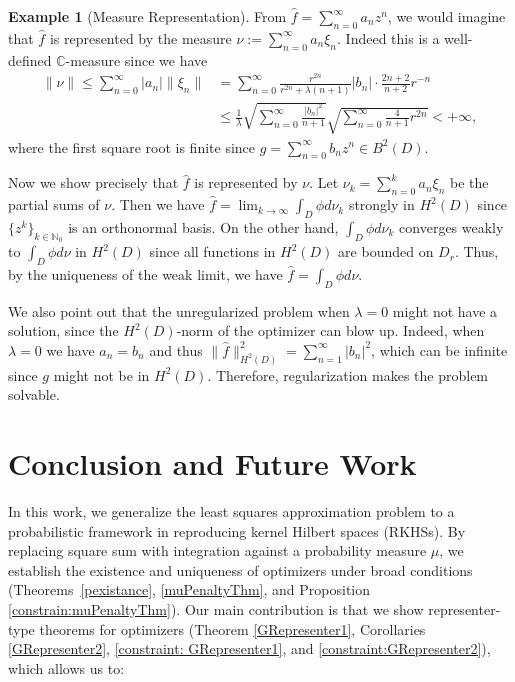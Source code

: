 \documentclass{amsart}
\numberwithin{equation}{section}
\newcommand\N{{\mathbb N}}
\theoremstyle{plain}
\theoremstyle{remark}
\theoremstyle{definition}
\newtheorem{example}[subsection]{Example}
\begin{document}
\begin{example}[Measure Representation]
From $\hat{f}=\sum_{n=0}^\infty a_nz^n$, we would imagine that $\hat{f}$ is represented by the measure $\nu:=\sum_{n=0}^\infty a_n \xi_n$.
Indeed this is a well-defined $\mathbb{C}$-measure since we have
\begin{align*}
        \|\nu\|\leq \sum_{n=0}^\infty |a_n|  \|\xi_n\|
    &= \sum_{n=0}^\infty \frac{r^{2n}}{r^{2n}+\lambda(n+1)}|b_n| \cdot \frac{2n+2}{n+2}r^{-n} \\
    &\leq \frac{1}{\lambda}\sqrt{\sum_{n=0}^\infty \frac{|b_n|^2}{n+1}}\sqrt{\sum_{n=0}^\infty\frac{4}{n+1}r^{2n}}<+\infty,
\end{align*}
where the first square root is finite since $g=\sum_{n=0}^\infty b_nz^n \in B^2(D)$. 
\par
Now we show precisely that $\hat{f}$ is represented by $\nu$.
Let $\nu_k  = \sum_{n=0}^k a_n \xi_n$ be the partial sums of $\nu$.
Then we have $\hat{f} = \lim_{k \rightarrow \infty} \int_D \phi d \nu_k$ strongly in $H^2(D)$ since $\{z^k\}_{k\in \N_0}$ is an orthonormal basis.
On the other hand, 
$\int_D \phi d \nu_k$ converges weakly to $\int_D \phi d \nu$ in $H^2(D)$ since all functions in $H^2(D)$ are bounded on $D_r$. Thus, by the uniqueness of the weak limit, we have $\hat{f}=\int_D \phi d\nu$.
\par
We also point out that the unregularized problem when $\lambda = 0$ might not have a solution, since the $H^2(D)$-norm of the optimizer can blow up.
Indeed, when $\lambda = 0$ we have $a_n=b_n$ and thus $\| \hat{f}\|_{H^2(D)}^2 = \sum_{n=1}^\infty |b_n|^2$, which can be infinite since $g$ might not be in $H^2(D)$.
Therefore, regularization makes the problem solvable.
\end{example}



\section{Conclusion and Future Work}\label{sec:conclusion}

In this work, we generalize the least squares approximation problem to a probabilistic framework in reproducing kernel Hilbert spaces (RKHSs). By replacing square sum with integration against a probability measure $\mu$, we establish the existence and uniqueness of optimizers under broad conditions (Theorems~\ref{pexistance}, \ref{muPenaltyThm}, and Proposition \ref{constrain:muPenaltyThm}). Our main contribution is that we show representer-type theorems for optimizers (Theorem \ref{GRepresenter1}, Corollaries \ref{GRepresenter2}, \ref{constraint: GRepresenter1}, and \ref{constraint:GRepresenter2}),
which allows us to:
\end{document}
